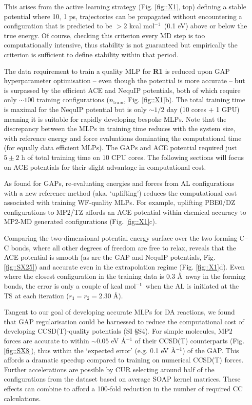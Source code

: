 \documentclass[twoside,twocolumn,9pt]{article}
\newcommand{\kcal}{kcal mol$^{-1}$}
\begin{document}
This arises from the active learning strategy (Fig. \ref{fig::X1}, top) defining a stable potential where 10, 1 ps, trajectories can be propagated without encountering a configuration that is predicted to be $>2$ \kcal~(0.1 eV) above or below the true energy. Of course, checking this criterion every MD step is too computationally intensive, thus stability is not guaranteed but empirically the criterion is sufficient to define stability within that period.


The data requirement to train a quality MLP for {\bfseries{R1}} is reduced upon GAP hyperparameter optimisation – even though the potential is more accurate – but is surpassed by the efficient ACE and NequIP potentials, both of which require only $\sim100$ training configurations ($n_\text{train}$, Fig. \ref{fig::X1}b). The total training time is maximal for the NequIP potential but is only $\sim1/2$ day (10 cores + 1 GPU) meaning it is suitable for rapidly developing bespoke MLPs. Note that the discrepancy between the MLPs in training time reduces with the system size, with reference energy and force evaluations dominating the computational time (for equally data efficient MLPs). The GAPs and ACE potential required just $5\pm2$ h of total training time on 10 CPU cores. The following sections will focus on ACE potentials for their slight advantage in computational cost.


As found for GAPs, re-evaluating energies and forces from AL configurations with a new reference method (aka. `uplifting’) reduces the computational cost associated with training WF-quality MLPs. For example, uplifting PBE0/DZ configurations to MP2/TZ affords an ACE potential within chemical accuracy to MP2-MD generated configurations (Fig. \ref{fig::X1}c).


Comparing the two-dimensional potential energy surface over the two forming C–C bonds, where all other degrees of freedom are free to relax, reveals that the ACE potential is smooth (as are the GAP and NequIP potentials, Fig. \ref{fig::SX25}) and accurate even in the extrapolation regime (Fig. \ref{fig::X1}d). Even where the closest configuration in the training data is 0.3 \AA~away in the forming bonds, the error is only a couple of \kcal~when the AL is initiated at the TS at each iteration ($r_1=r_2=2.30$ \AA).


Tangent to our goal of developing accurate MLPs for DA reactions, we found that GAP regularisation could be harnessed to reduce the computational cost of developing CCSD(T)-quality potentials (SI §S4). For simple molecules, MP2 forces are accurate to within $\sim0.05$ eV \AA${}^{-1}$ of their CCSD(T) counterparts (Fig. \ref{fig::SX8}), thus within the `expected error’ (e.g. 0.1 eV \AA${}^{-1}$) of the GAP. This affords a dramatic speedup compared to training on numerical CCSD(T) forces. Further accelerations are possible by CUR\cite{Mahoney2009} selecting around half of the configurations from the dataset based on average SOAP kernel matrices. These effects can combine to afford a 100-fold reduction in the number of required CC calculations.
\end{document}
